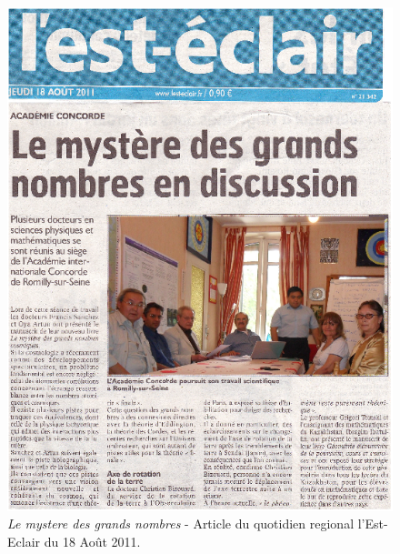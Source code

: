 \documentclass[a4paper,12pt]{article}
\begin{document}
\begin{appendix}
\begin{figure}
\centering
\includegraphics{./figures/lesteclair.png}
\caption [L'est-Eclair: Le mystere des grands nombres]{\textit{Le mystere des grands nombres} - Article du quotidien regional l'Est-Eclair du 18 Ao\^ut 2011.} 
\label{fig:5:figure5}
\end{figure}


\end{appendix}
\end{document}
